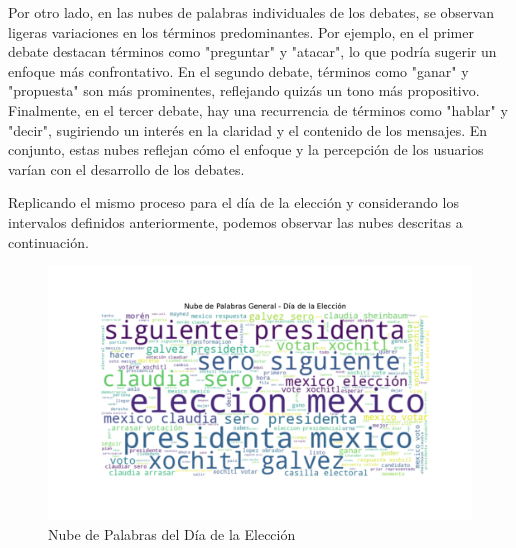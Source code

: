 \documentclass[10pt, a4paper]{article}
\begin{document}
	Por otro lado, en las nubes de palabras individuales de los debates, se observan ligeras variaciones en los términos predominantes. Por ejemplo, en el primer debate destacan términos como "preguntar" y "atacar", lo que podría sugerir un enfoque más confrontativo. En el segundo debate, términos como "ganar" y "propuesta" son más prominentes, reflejando quizás un tono más propositivo. Finalmente, en el tercer debate, hay una recurrencia de términos como "hablar" y "decir", sugiriendo un interés en la claridad y el contenido de los mensajes. En conjunto, estas nubes reflejan cómo el enfoque y la percepción de los usuarios varían con el desarrollo de los debates.
	
	Replicando el mismo proceso para el día de la elección y considerando los intervalos definidos anteriormente, podemos observar las nubes descritas a continuación.
	
	\newpage
	
	
	\vspace{-4mm}
	\begin{figure}[h!]
		\centering
		\includegraphics[width=1\textwidth]{nube_general_eleccion.pdf} %
		\vspace{-22mm}
		\caption{Nube de Palabras del Día de la Elección}
		\label{fig:nubeDiaEleccion} %
	\end{figure}
	
\end{document}
